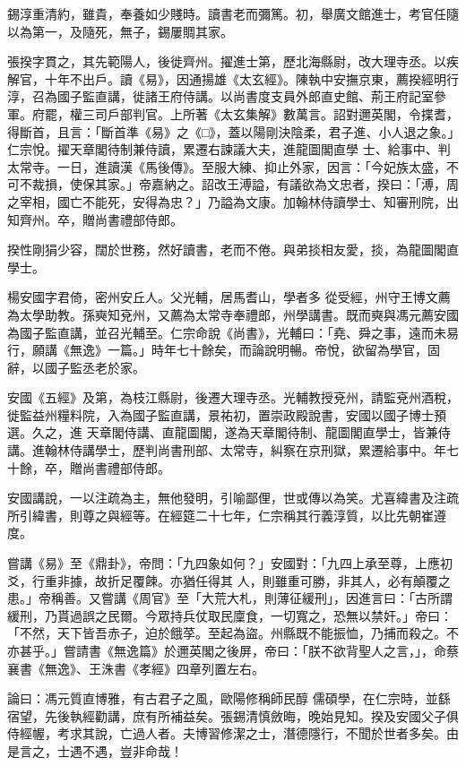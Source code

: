 \begin{pinyinscope}
 錫淳重清約，雖貴，奉養如少賤時。讀書老而彌篤。初，舉廣文館進士，考官任隨以為第一，及隨死，無子，錫屢賙其家。



 張揆字貫之，其先範陽人，後徙齊州。擢進士第，歷北海縣尉，改大理寺丞。以疾解官，十年不出戶。讀《易》，因通揚雄《太玄經》。陳執中安撫京東，薦揆經明行淳，召為國子監直講，徙諸王府侍講。以尚書度支員外郎直史館、荊王府記室參軍。府罷，權三司戶部判官。上所著《太玄集解》數萬言。詔對邇英閣，令揲耆，得斷首，且言：「斷首準《易》之《□》，蓋以陽剛決陰柔，君子進、小人退之象。」仁宗悅。擢天章閣待制兼侍讀，累遷右諫議大夫，進龍圖閣直學
 士、給事中、判太常寺。一日，進讀漢《馬後傳》。至服大練、抑止外家，因言：「今妃族太盛，不可不裁損，使保其家。」帝嘉納之。詔改王溥謚，有議欲為文忠者，揆曰：「溥，周之宰相，國亡不能死，安得為忠？」乃謚為文康。加翰林侍讀學士、知審刑院，出知齊州。卒，贈尚書禮部侍郎。



 揆性剛狷少容，闊於世務，然好讀書，老而不倦。與弟掞相友愛，掞，為龍圖閣直學士。



 楊安國字君倚，密州安丘人。父光輔，居馬耆山，學者多
 從受經，州守王博文薦為太學助教。孫奭知兗州，又薦為太常寺奉禮郎，州學講書。既而奭與馮元薦安國為國子監直講，並召光輔至。仁宗命說《尚書》，光輔曰：「堯、舜之事，遠而未易行，願講《無逸》一篇。」時年七十餘矣，而論說明暢。帝悅，欲留為學官，固辭，以國子監丞老於家。



 安國《五經》及第，為枝江縣尉，後遷大理寺丞。光輔教授兗州，請監兗州酒稅，徙監益州糧料院，入為國子監直講，景祐初，置崇政殿說書，安國以國子博士預選。久之，進
 天章閣侍講、直龍圖閣，遂為天章閣待制、龍圖閣直學士，皆兼侍講。進翰林侍講學士，歷判尚書刑部、太常寺，糾察在京刑獄，累遷給事中。年七十餘，卒，贈尚書禮部侍郎。



 安國講說，一以注疏為主，無他發明，引喻鄙俚，世或傳以為笑。尤喜緯書及注疏所引緯書，則尊之與經等。在經筵二十七年，仁宗稱其行義淳質，以比先朝崔遵度。



 嘗講《易》至《鼎卦》，帝問：「九四象如何？」安國對：「九四上承至尊，上應初爻，行重非據，故折足覆餗。亦猶任得其
 人，則雖重可勝，非其人，必有顛覆之患。」帝稱善。又嘗講《周官》至「大荒大札，則薄征緩刑」，因進言曰：「古所謂緩刑，乃貰過誤之民爾。今眾持兵仗取民廩食，一切寬之，恐無以禁奸。」帝曰：「不然，天下皆吾赤子，迫於餓莩。至起為盜。州縣既不能振恤，乃捕而殺之。不亦甚乎。」嘗請書《無逸篇》於邇英閣之後屏，帝曰：「朕不欲背聖人之言，」，命蔡襄書《無逸》、王洙書《孝經》四章列置左右。



 論曰：馮元質直博雅，有古君子之風，歐陽修稱師民醇
 儒碩學，在仁宗時，並繇宿望，先後執經勸講，庶有所補益矣。張錫清慎斂晦，晚始見知。揆及安國父子俱侍經幄，考求其說，亡過人者。夫博習修潔之士，潛德隱行，不聞於世者多矣。由是言之，士遇不遇，豈非命哉！



\end{pinyinscope}